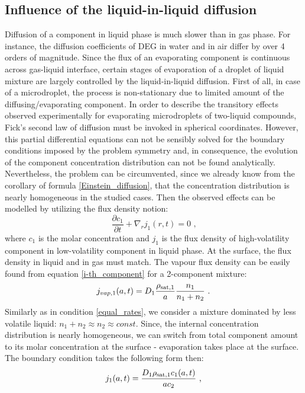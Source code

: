 \documentclass[twoside,twocolumn,9pt]{article}
\begin{document}
\subsection{Influence of the liquid-in-liquid diffusion} \label{liquid-liquid}
Diffusion of a component in liquid phase is much slower than in gas phase. For instance, the diffusion coefficients of DEG in water and in air differ by over 4 orders of magnitude. Since the flux of an evaporating component is continuous across gas-liquid interface, certain stages of evaporation of a droplet of liquid mixture are largely controlled by the liquid-in-liquid diffusion. First of all, in case of a microdroplet, the process is non-stationary due to limited amount of the diffusing/evaporating component. In order to describe the transitory effects observed experimentally for evaporating microdroplets of two-liquid compounds, Fick's second law of diffusion must be invoked in spherical coordinates. However, this partial differential equations can not be sensibly solved for the boundary conditions imposed by the problem symmetry and, in consequence, the evolution of the component concentration distribution can not be found analytically. Nevertheless, the problem can be circumvented, since we already know from the corollary of formula \ref{Einstein_diffusion}, that the concentration distribution is nearly homogeneous in the studied cases. Then the observed effects can be modelled by utilizing the flux density notion:
\begin{equation}
\frac{\partial c_1}{\partial t} + \nabla _r j_1(r,t) = 0 \mbox{~,}
\label{II_Fick}
\end{equation}
where $c_1$ is the molar concentration and $j_1$ is the flux density of high-volatility component in low-volatility component in liquid phase.
At the surface, the flux density in liquid and in gas must match. The vapour flux density can be easily found from equation \ref{i-th_component} for a 2-component mixture:
\begin{equation}
j_{vap,1}(a,t) = D_{1} \frac{\rho_{{\rm sat},1}}{a} \frac{n_1}{n_1+n_2} \mbox{~.}
\end{equation}
Similarly as in condition \ref{equal_rates}, we consider a mixture dominated by less volatile liquid: $n_1 + n_2 \approx n_2 \approx const$. Since, the internal concentration distribution is nearly homogeneous, we can switch from total component amount to its molar concentration at the surface - evaporation takes place at the surface. The boundary condition takes the following form then:
\begin{equation}
j_1(a,t) = \frac{D_{1} \rho_{{\rm sat},1} c_1(a,t)}{a c_2} \mbox{~,}
\label{boundary_conditions_a}
\end{equation}
\end{document}
